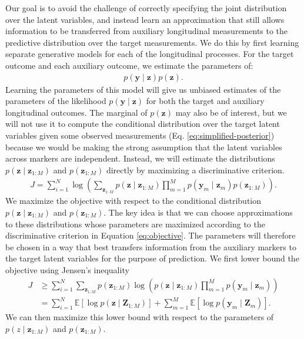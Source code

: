 \documentclass[12pt]{article}
\newcommand{\E}{\mathbb{E}}
\newcommand{\given}{\mid}
\begin{document}
Our goal is to avoid the challenge of correctly specifying the joint distribution over the latent variables, and instead learn an approximation that still allows information to be transferred from auxiliary longitudinal measurements to the predictive distribution over the target measurements. We do this by first learning separate generative models for each of the longitudinal processes. For the target outcome and each auxiliary outcome, we estimate the parameters of:
\begin{align}
p(\bm{y} \given \bm{z}) p(\bm{z}).
\end{align}
Learning the parameters of this model will give us unbiased estimates of the parameters of the likelihood $p(\bm{y} \given \bm{z})$ for both the target and auxiliary longitudinal outcomes. The marginal of $p(\bm{z})$ may also be of interest, but we will not use it to compute the conditional distribution over the target latent variables given some observed measurements (Eq. \ref{eq:simplified-posterior}) because we would be making the strong assumption that the latent variables across markers are independent. Instead, we will estimate the distributions $p(\bm{z} \given \bm{z}_{1:M})$ and $p(\bm{z}_{1:M})$ directly by maximizing a discriminative criterion.
\begin{align}
\label{eq:objective}
J =
\sum_{i=1}^N \log \left(
	\sum_{\bm{z}_{1:M}} p(\bm{z} \given \bm{z}_{1:M}) \prod_{m=1}^M p(\bm{y}_m \given \bm{z}_m) p(\bm{z}_{1:M})
\right).
\end{align}
We maximize the objective with respect to the conditional distribution \mbox{$p(\bm{z} \given \bm{z}_{1:M})$} and $p(\bm{z}_{1:M})$. The key idea is that we can choose approximations to these distributions whose parameters are maximized according to the discriminative criterion in Equation \ref{eq:objective}. The parameters will therefore be chosen in a way that best transfers information from the auxiliary markers to the target latent variables for the purpose of prediction. We first lower bound the objective using Jensen's inequality
\begin{align}
J &\ge \sum_{i=1}^N \sum_{\bm{z}_{1:M}} p(\bm{z}_{1:M}) \log \left( p(\bm{z} \given \bm{z}_{1:M}) \prod_{m=1}^M p(\bm{y}_m \given \bm{z}_m) \right) \\
	&= \sum_{i=1}^N \E[\log p(\bm{z} \given \bm{Z}_{1:M})] + \sum_{m=1}^M \E[\log p(\bm{y}_m \given \bm{Z}_m)].
\end{align}
We can then maximize this lower bound with respect to the parameters of $p(z \given \bm{z}_{1:M})$ and $p(\bm{z}_{1:M})$.
\end{document}
